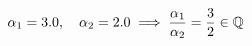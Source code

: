 \documentclass[preview]{standalone}
\begin{document}
\begin{align*}
\special{dvisvgm:raw <g id='unique000'>}\alpha_1 = 3.0, \quad \alpha_2 = 2.0 \implies \frac{\alpha_1}{\alpha_2} = \frac{3}{2} \in \mathbb{Q}\special{dvisvgm:raw </g>}
\end{align*}
\end{document}
